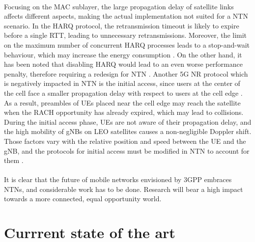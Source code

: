 \paragraph{} Focusing on the \ac{MAC} sublayer, the large propagation delay of satellite links affects different aspects, making the actual implementation not suited for a \ac{NTN} scenario. In the \ac{HARQ} protocol, the retransmission timeout is likely to expire before a single \ac{RTT}, leading to unnecessary retransmissions. Moreover, the limit on the maximum number of concurrent \ac{HARQ} processes leads to a stop-and-wait behaviour, which may increase the energy consumption \cite{3gpp-tr-38.811}. On the other hand, it has been noted that disabling \ac{HARQ} would lead to an even worse performance penalty, therefore requiring a redesign for \ac{NTN} \cite{5g-beyond-5g-ntn-trends-vanellicoralli}. Another 5G \ac{NR} protocol which is negatively impacted in \ac{NTN} is the initial access, since users at the center of the cell face a smaller propagation delay with respect to users at the cell edge \cite{5g-beyond-5g-ntn-trends-vanellicoralli} \cite{applying-nr-technologies-in-ntn-lee}. As a result, preambles of \ac{UE}s placed near the cell edge may reach the satellite when the \ac{RACH} opportunity has already expired, which may lead to collisions. During the initial access phase, \ac{UE}s are not aware of their propagation delay, and the high mobility of \ac{gNB}s on \ac{LEO} satellites causes a non-negligible Doppler shift. Those factors vary with the relative position and speed between the \ac{UE} and the \ac{gNB}, and the protocols for initial access must be modified in \ac{NTN} to account for them \cite{ntn-from-5g-6g-hassan}. 
\paragraph{}
It is clear that the future of mobile networks envisioned by \ac{3GPP} embraces \ac{NTN}s, and considerable work has to be done. Research will bear a high impact towards a more connected, equal opportunity world. 

\section{Currrent state of the art}
